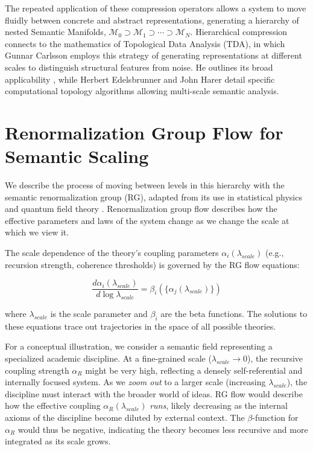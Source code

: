 The repeated application of these compression operators allows a system to move fluidly between concrete and abstract representations, generating a hierarchy of nested Semantic Manifolds, \(\mathcal{M}_0 \supset \mathcal{M}_1 \supset \cdots \supset \mathcal{M}_N\). Hierarchical compression connects to the mathematics of Topological Data Analysis (TDA), in which Gunnar Carlsson employs this strategy of generating representations at different scales to distinguish structural features from noise. He outlines its broad applicability \autocite{Carlsson2009}, while Herbert Edelsbrunner and John Harer \autocite{EdelsbrunnerHarer2010} detail specific computational topology algorithms allowing multi-scale semantic analysis.


\section{Renormalization Group Flow for Semantic Scaling}
\label{15.3:renormalization_group_flow_for_semantic_scaling}

We describe the process of moving between levels in this hierarchy with the semantic renormalization group (RG), adapted from its use in statistical physics and quantum field theory \autocite{Wilson1971, Cardy1996}. Renormalization group flow describes how the effective parameters and laws of the system change as we change the scale at which we view it.

The scale dependence of the theory's coupling parameters \(\alpha_i(\lambda_{scale})\) (e.g., recursion strength, coherence thresholds) is governed by the RG flow equations:

\begin{equation}
\frac{d\alpha_i(\lambda_{scale})}{d\log\lambda_{scale}} = \beta_i(\{\alpha_j(\lambda_{scale})\})
\end{equation}

where \(\lambda_{scale}\) is the scale parameter and \(\beta_i\) are the beta functions. The solutions to these equations trace out trajectories in the space of all possible theories.

For a conceptual illustration, we consider a semantic field representing a specialized academic discipline. At a fine-grained scale (\(\lambda_{scale} \to 0\)), the recursive coupling strength \(\alpha_R\) might be very high, reflecting a densely self-referential and internally focused system. As we \textit{zoom out} to a larger scale (increasing \(\lambda_{scale}\)), the discipline must interact with the broader world of ideas. RG flow would describe how the effective coupling \(\alpha_R(\lambda_{scale})\) \textit{runs}, likely decreasing as the internal axioms of the discipline become diluted by external context. The \(\beta\)-function for \(\alpha_R\) would thus be negative, indicating the theory becomes less recursive and more integrated as its scale grows.

